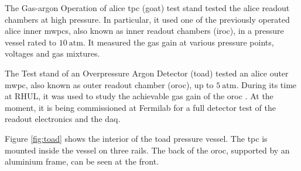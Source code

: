 The Gas-argon Operation of \gls{alice} \gls{tpc} (\gls{goat}) test stand tested the \gls{alice} readout chambers at high pressure. In particular, it used one of the previously operated \gls{alice} inner \gls{mwpc}s, also known as inner readout chambers (\gls{iroc}), in a pressure vessel rated to $10~\mathrm{atm}$. It measured the gas gain at various pressure points, voltages and gas mixtures.

The Test stand of an Overpressure Argon Detector (\gls{toad}) tested an \gls{alice} outer \gls{mwpc}, also known as outer readout chamber (\gls{oroc}), up to $5~\mathrm{atm}$. During its time at RHUL, it was used to study the achievable gas gain of the \gls{oroc} \cite{Ritchie-Yates2023}. At the moment, it is being commissioned at Fermilab for a full detector test of the readout electronics and the \gls{daq}.

Figure \ref{fig:toad} shows the interior of the \gls{toad} pressure vessel. The \gls{tpc} is mounted inside the vessel on three rails. The back of the \gls{oroc}, supported by an aluminium frame, can be seen at the front.

